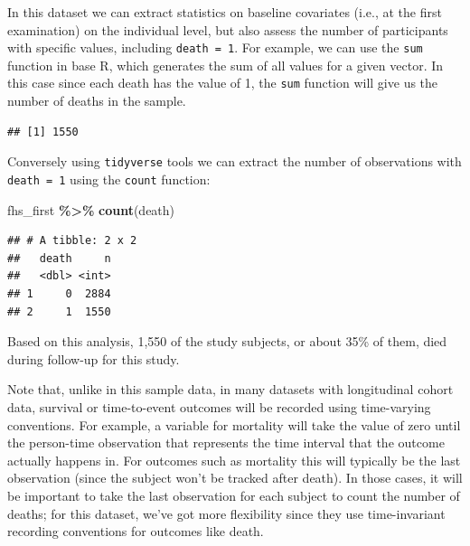 \documentclass[
]{book}
\newenvironment{Shaded}{\begin{snugshade}}{\end{snugshade}}
\newcommand{\FunctionTok}[1]{\textcolor[rgb]{0.13,0.29,0.53}{\textbf{#1}}}
\newcommand{\NormalTok}[1]{#1}
\newcommand{\SpecialCharTok}[1]{\textcolor[rgb]{0.81,0.36,0.00}{\textbf{#1}}}
\begin{document}
In this dataset we can extract statistics on baseline covariates (i.e., at the first examination) on the individual level, but also assess the number of participants with specific values, including \texttt{death\ =\ 1}. For example, we can use the \texttt{sum} function in base R, which generates the sum of all values for a given vector. In this case since each death has the value of 1, the \texttt{sum} function will give us the number of deaths in the sample.

\begin{Shaded}
\end{Shaded}

\begin{verbatim}
## [1] 1550
\end{verbatim}

Conversely using \texttt{tidyverse} tools we can extract the number of observations with \texttt{death\ =\ 1} using the \texttt{count} function:

\begin{Shaded}
\begin{Highlighting}[]
\NormalTok{fhs\_first }\SpecialCharTok{\%\textgreater{}\%} 
  \FunctionTok{count}\NormalTok{(death) }
\end{Highlighting}
\end{Shaded}

\begin{verbatim}
## # A tibble: 2 x 2
##   death     n
##   <dbl> <int>
## 1     0  2884
## 2     1  1550
\end{verbatim}

Based on this analysis, 1,550 of the study subjects, or about 35\% of them, died during follow-up for this study.

Note that, unlike in this sample data, in many datasets with longitudinal cohort data, survival or time-to-event outcomes will be recorded using time-varying conventions. For example, a variable for mortality will take the value of zero until the person-time observation that represents the time interval that the outcome actually happens in. For outcomes such as mortality this will typically be the last observation (since the subject won't be tracked after death). In those cases, it will be important to take the last observation for each subject to count the number of deaths; for this dataset, we've got more flexibility since they use time-invariant recording conventions for outcomes like death.
\end{document}
